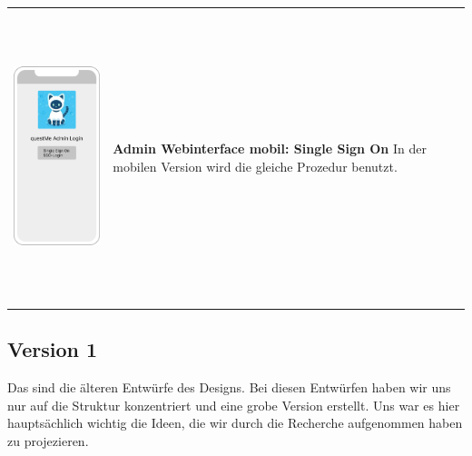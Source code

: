 \begin{tabular}{C{6cm}  L{7cm}}
    \includegraphics[width=5cm,height=8.5cm]{bilder/new vers. UI Design/Login SSO/Interface SSO v1.2.png}               & \textbf{Admin Webinterface mobil: Single Sign On} \newline
    In der mobilen Version wird die gleiche Prozedur benutzt.
\end{tabular}

\newpage

\subsection{Version 1}

Das sind die älteren Entwürfe des Designs. Bei diesen Entwürfen haben wir uns nur auf die Struktur
konzentriert und eine grobe Version erstellt. Uns war es hier hauptsächlich wichtig
die Ideen, die wir durch die Recherche aufgenommen haben zu projezieren.
\\

